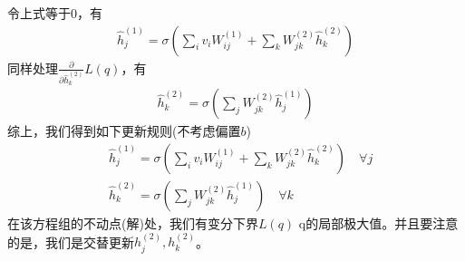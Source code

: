         令上式等于0，有
        \begin{align*}
        \hat{h}_j^{(1)}=\sigma \left( \sum_i v_i W_{ij}^{(1)} + \sum_kW_{jk}^{(2)}\hat{h}_k^{(2)} \right)
        \end{align*}
        同样处理$\frac{\partial }{\partial \hat{h}_k^{(2)}} L(q)$，有
        \begin{align*}
        \hat{h}_k^{(2)}=\sigma \left( \sum_jW_{jk}^{(2)}\hat{h}_j^{(1)} \right)
        \end{align*}
        综上，我们得到如下更新规则(不考虑偏置$b$)
        \begin{align*}
        & \hat{h}_j^{(1)}=\sigma \left( \sum_i v_i W_{ij}^{(1)} + \sum_kW_{jk}^{(2)}\hat{h}_k^{(2)} \right)\quad \forall j\\
        & \hat{h}_k^{(2)}=\sigma \left( \sum_jW_{jk}^{(2)}\hat{h}_j^{(1)} \right)\quad \forall k
        \end{align*}
        在该方程组的不动点(解)处，我们有变分下界$L(q)$ q的局部极大值。并且要注意的是，我们是交替更新$h_j^{(2)},h_k^{(2)}$。
